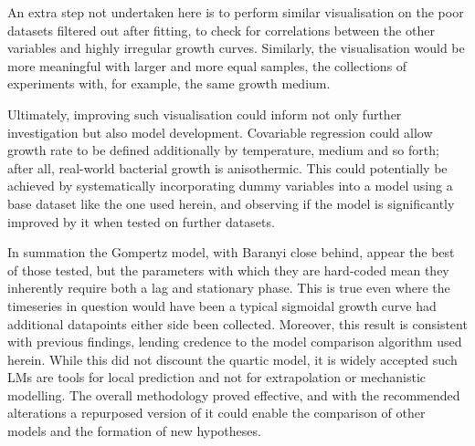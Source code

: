 \documentclass[11pt]{article}
\begin{document}
An extra step not undertaken here is to perform similar visualisation on the poor datasets filtered out after fitting, to check for correlations between the other variables and highly irregular growth curves. Similarly, the visualisation would be more meaningful with larger and more equal samples, the collections of experiments with, for example, the same growth medium.

Ultimately, improving such visualisation could inform not only further investigation but also model development. Covariable regression could allow growth rate to be defined additionally by temperature, medium and so forth; after all, real-world bacterial growth is anisothermic. This could potentially be achieved by systematically incorporating dummy variables into a model using a base dataset like the one used herein, and observing if the model is significantly improved by it when tested on further datasets.\parencites{Suits2016}

In summation the Gompertz model, with Baranyi close behind, appear the best of those tested, but the parameters with which they are hard-coded mean they inherently require both a lag and stationary phase. This is true even where the timeseries in question would have been a typical sigmoidal growth curve had additional datapoints either side been collected. Moreover, this result is consistent with previous findings, lending credence to the model comparison algorithm used herein. While this did not discount the quartic model, it is widely accepted such LMs are tools for local prediction and not for extrapolation or mechanistic modelling. The overall methodology proved effective, and with the recommended alterations a repurposed version of it could enable the comparison of other models and the formation of new hypotheses.


\newpage

\printbibliography[heading=bibintoc]
\end{document}
